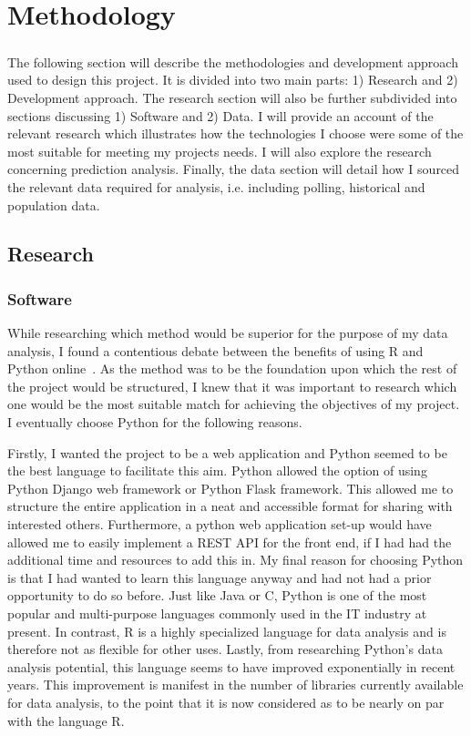 \chapter{Methodology}
\paragraph{}
The following section will describe the methodologies and development approach used to design this project. It is divided into two main parts: 1) Research and 2) Development approach. The research section will also be further subdivided into sections discussing 1) Software and 2) Data. I will provide an account of the relevant research which illustrates how the technologies I choose were some of the most suitable for meeting my projects needs. I will also explore the research
concerning prediction analysis. Finally, the data section will detail how I sourced the
relevant data required for analysis, i.e. including polling, historical and population data.

\section{Research}
\subsection{Software}
While researching which method would be superior for the purpose of my data analysis, I found a contentious debate between the benefits of using R and Python online~\cite{debate}. As the method was to be the foundation upon which the rest of the project would be structured, I knew that it was important to research which one would be the most suitable match for achieving the objectives of my project. I eventually choose Python for the following reasons.

Firstly, I wanted the project to be a web application and Python seemed to be the best language to facilitate this aim. Python allowed the option of using Python Django web framework or Python Flask framework. This allowed me to structure the entire application in a neat and accessible format for sharing with interested others. Furthermore, a python web application set-up would have allowed me to easily implement a REST API for the front end, if I had had the additional time and resources to add this in. My final reason for choosing Python is that I had wanted to learn this language anyway and had not had a prior opportunity to do so before. Just like Java or C, Python is one of the most popular and multi-purpose languages commonly used in the IT industry at present. In contrast, R is a highly specialized language for data analysis and is therefore not as flexible for other uses. Lastly, from researching Python's data analysis potential, this language seems to have improved exponentially in recent years. This improvement is manifest in the number of libraries currently available for data analysis, to the point that it is now considered as to be nearly on par with the language R.

